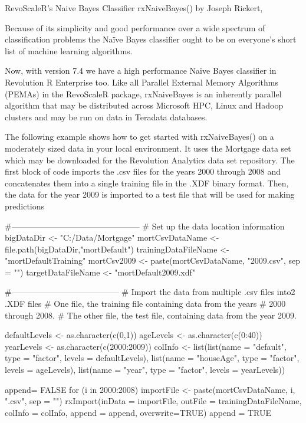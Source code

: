 RevoScaleR's Naive Bayes Classifier rxNaiveBayes()
by Joseph Rickert,

Because of its simplicity and good performance over a wide spectrum of classification problems the Naïve Bayes classifier 
ought to be on everyone's short list of machine learning algorithms. 

Now, with version 7.4 we have a high performance Naïve Bayes classifier in Revolution R Enterprise too. 
Like all Parallel External Memory Algorithms (PEMAs) in the RevoScaleR package, rxNaiveBayes is an inherently parallel 
algorithm that may be distributed across Microsoft HPC, Linux and Hadoop clusters and may be run on data in Teradata 
databases.

The following example shows how to get started with rxNaiveBayes() on a moderately sized data in your local environment. 
It uses the Mortgage data set which may be downloaded for the Revolution Analytics data set repository. 
The first block of code imports the .csv files for the years 2000 through 2008 and concatenates them into a single 
training file in the .XDF binary format. Then, the data for the year 2009 is imported to a test file that will be used 
for making predictions

#-----------------------------------------------
# Set up the data location information
bigDataDir <- "C:/Data/Mortgage" 
mortCsvDataName <- file.path(bigDataDir,"mortDefault") 
trainingDataFileName <- "mortDefaultTraining" 
mortCsv2009 <- paste(mortCsvDataName, "2009.csv", sep = "") 
targetDataFileName <- "mortDefault2009.xdf"
 
 
#--------------------------------------- 
# Import the data from multiple .csv files into2 .XDF files
# One file, the training file containing data from the years
# 2000 through 2008.
# The other file, the test file, containing data from the year 2009.
 
defaultLevels <- as.character(c(0,1)) 
ageLevels <- as.character(c(0:40)) 
yearLevels <- as.character(c(2000:2009)) 
colInfo <- list(list(name  = "default", type = "factor", levels = defaultLevels), 
	       list(name = "houseAge", type = "factor", levels = ageLevels), 
		   list(name = "year", type = "factor", levels = yearLevels)) 
 
append= FALSE 
for (i in 2000:2008) { 
     importFile <- paste(mortCsvDataName, i, ".csv", sep = "")     
	 rxImport(inData = importFile, outFile = trainingDataFileName,     
		      colInfo = colInfo, append = append, overwrite=TRUE)     
	          append = TRUE }  

